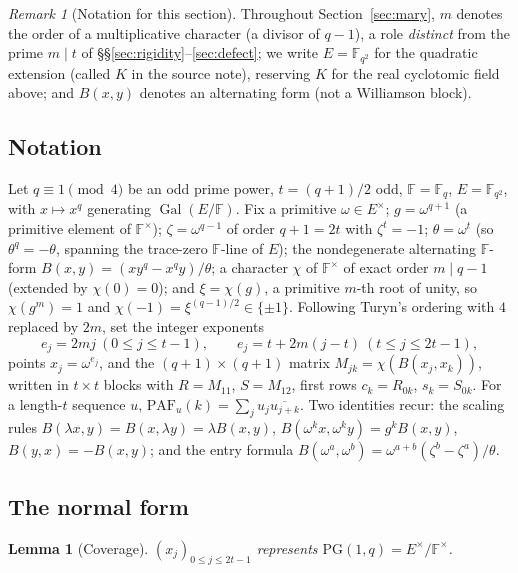 \documentclass[11pt]{article}
\theoremstyle{plain}
\newtheorem{lemma}[theorem]{Lemma}
\theoremstyle{definition}
\theoremstyle{remark}
\newtheorem{remark}[theorem]{Remark}
\newcommand{\F}{\mathbb F}
\newcommand{\Gal}{\operatorname{Gal}}
\newcommand{\PG}{\mathrm{PG}}
\newcommand{\paf}{\mathrm{PAF}}
\begin{document}
\begin{remark}[Notation for this section]\label{rem:maryscope}
Throughout Section~\ref{sec:mary}, $m$ denotes the order of a multiplicative
character (a divisor of $q-1$), a role \emph{distinct} from the prime $m\mid t$
of \S\S\ref{sec:rigidity}--\ref{sec:defect}; we write $E=\F_{q^2}$ for the
quadratic extension (called $K$ in the source note), reserving $K$ for the real
cyclotomic field above; and $B(x,y)$ denotes an alternating form (not a
Williamson block).
\end{remark}

\subsection{Notation}\label{sec:marynotation}

Let $q\equiv1\pmod4$ be an odd prime power, $t=(q+1)/2$ odd, $\F=\F_q$,
$E=\F_{q^2}$, with $x\mapsto x^q$ generating $\Gal(E/\F)$. Fix a primitive
$\omega\in E^\times$; $g=\omega^{q+1}$ (a primitive element of $\F^\times$);
$\zeta=\omega^{q-1}$ of order $q+1=2t$ with $\zeta^t=-1$; $\theta=\omega^t$
(so $\theta^q=-\theta$, spanning the trace-zero $\F$-line of $E$); the
nondegenerate alternating $\F$-form $B(x,y)=(xy^q-x^qy)/\theta$; a character
$\chi$ of $\F^\times$ of exact order $m\mid q-1$ (extended by $\chi(0)=0$); and
$\xi=\chi(g)$, a primitive $m$-th root of unity, so $\chi(g^m)=1$ and
$\chi(-1)=\xi^{(q-1)/2}\in\{\pm1\}$. Following Turyn's ordering with $4$ replaced
by $2m$, set the integer exponents
\begin{equation}\label{eq:ordering}
  e_j=2mj\ (0\le j\le t-1),\qquad e_j=t+2m(j-t)\ (t\le j\le2t-1),
\end{equation}
points $x_j=\omega^{e_j}$, and the $(q+1)\times(q+1)$ matrix
$M_{jk}=\chi(B(x_j,x_k))$, written in $t\times t$ blocks with $R=M_{11}$,
$S=M_{12}$, first rows $c_k=R_{0k}$, $s_k=S_{0k}$. For a length-$t$ sequence $u$,
$\paf_u(k)=\sum_j u_j\overline{u_{j+k}}$. Two identities recur: the scaling
rules $B(\lambda x,y)=B(x,\lambda y)=\lambda B(x,y)$,
$B(\omega^kx,\omega^ky)=g^kB(x,y)$, $B(y,x)=-B(x,y)$; and the entry formula
$B(\omega^a,\omega^b)=\omega^{a+b}(\zeta^b-\zeta^a)/\theta$.

\subsection{The normal form}

\begin{lemma}[Coverage]\label{lem:coverage}
$(x_j)_{0\le j\le2t-1}$ represents $\PG(1,q)=E^\times/\F^\times$.
\end{lemma}
\end{document}
